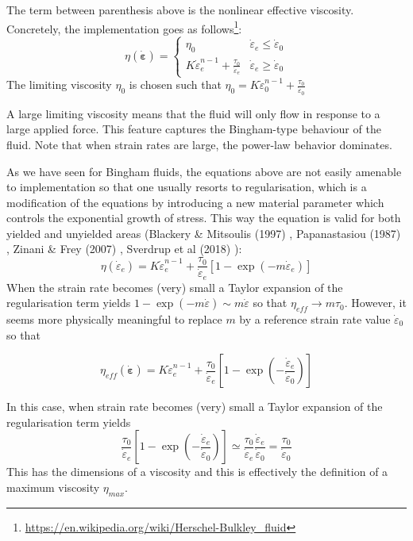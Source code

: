 The term between parenthesis above is the nonlinear effective viscosity. 
Concretely, the implementation goes as 
follows\footnote{\url{https://en.wikipedia.org/wiki/Herschel-Bulkley_fluid}}:
\begin{equation}
\eta(\dot{\bm \varepsilon}) = 
\left\{
\begin{array}{cc}
\eta_0 & \dot{\varepsilon}_e\leq \dot{\varepsilon}_0 \\ 
K \dot{\varepsilon}_e^{n-1} + \frac{\tau_0}{\dot{\varepsilon}_e} & \dot{\varepsilon}_e \geq \dot{\varepsilon}_0
\end{array}
\right.
\end{equation}
The limiting viscosity $\eta_0$ is chosen such that 
$\eta_0 =  K \dot{\varepsilon}_0^{n-1} + \frac{\tau_0}{\dot{\varepsilon}_0}$

A large limiting viscosity means that the fluid will only flow in response to a large applied force. 
This feature captures the Bingham-type behaviour of the fluid. 
Note that when strain rates are large, the power-law behavior dominates. 

As we have seen for Bingham fluids, the equations above are not easily amenable to implementation so that 
one usually resorts to regularisation, which is a modification of the 
equations by introducing a new material parameter which controls the exponential 
growth of stress. This way the equation is valid for both yielded 
and unyielded areas (Blackery \& Mitsoulis (1997) \cite{blmi97},
Papanastasiou (1987) \cite{papa87}, Zinani \& Frey (2007) \cite{zifr07}, 
Sverdrup et al (2018) \cite{svna18}):
\begin{equation}
\eta(\dot{\varepsilon}_e) 
= K \dot{\varepsilon}_e^{n-1} + \frac{\tau_0}{\dot{\varepsilon}_e} [1 - \exp(-m \dot{\varepsilon}_e)] 
\end{equation}
When the strain rate becomes (very) small a Taylor expansion of the regularisation 
term yields $1- \exp(-m \dot{\varepsilon}) \sim m \dot{\varepsilon} $ so that 
$\eta_{eff} \rightarrow m \tau_0$.
However, it seems more physically meaningful to replace $m$ by a reference strain 
rate value $\dot{\varepsilon}_0$ so that 
\begin{mdframed}[backgroundcolor=blue!5]
\begin{equation}
\eta_{eff}(\dot{\bm \varepsilon}) 
= K \dot{\varepsilon}_e^{n-1} + \frac{\tau_0}{\dot{\varepsilon}_e} 
\left[1 - \exp\left(-\frac{\dot{\varepsilon}_e}{\dot{\varepsilon}_0} \right) \right]
\end{equation}
\end{mdframed}
In this case, when strain rate becomes (very) small a Taylor expansion of the regularisation
term yields
\begin{equation}
\frac{\tau_0}{\dot{\varepsilon}_e} \left[1 - 
\exp\left(-\frac{\dot{\varepsilon}_e}{\dot{\varepsilon}_0} \right) \right]
\simeq 
\frac{\tau_0}{\dot{\varepsilon}_e} \frac{\dot{\varepsilon}_e}{\dot{\varepsilon}_0}
=\frac{\tau_0}{\dot{\varepsilon}_0} 
\end{equation}
This has the dimensions of a viscosity and this is effectively the definition 
of a maximum viscosity $\eta_{max}$.

